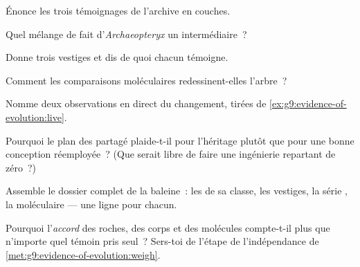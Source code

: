 \begin{exercise}[$\star$]\label{exo:g9:evidence-of-evolution:2}
Énonce les trois témoignages de l'archive en couches.
\end{exercise}

\begin{exercise}[$\star$]\label{exo:g9:evidence-of-evolution:3}
Quel mélange de  fait d'\emph{Archaeopteryx} un
intermédiaire~?
\end{exercise}

\begin{exercise}[$\star$]\label{exo:g9:evidence-of-evolution:4}
Donne trois vestiges et dis de quoi chacun témoigne.
\end{exercise}

\begin{exercise}[$\star$]\label{exo:g9:evidence-of-evolution:5}
Comment les comparaisons moléculaires redessinent-elles
l'arbre~?
\end{exercise}

\begin{exercise}[$\star$]\label{exo:g9:evidence-of-evolution:6}
Nomme deux observations en direct du changement, tirées de
\cref{ex:g9:evidence-of-evolution:live}.
\end{exercise}

\begin{exercise}[$\star\star$]\label{exo:g9:evidence-of-evolution:7}
Pourquoi le plan des  partagé plaide-t-il pour
l'héritage plutôt que pour une bonne conception
réemployée~? (Que serait libre de faire une ingénierie
repartant de zéro~?)
\end{exercise}

\begin{exercise}[$\star\star$]\label{exo:g9:evidence-of-evolution:8}
Assemble le dossier complet de la baleine~: les 
de sa classe, les vestiges, la série , la 
moléculaire --- une ligne pour chacun.
\end{exercise}

\begin{exercise}[$\star\star$]\label{exo:g9:evidence-of-evolution:9}
Pourquoi l'\emph{accord} des roches, des corps et des
molécules compte-t-il plus que n'importe quel témoin pris
seul~? Sers-toi de l'étape de l'indépendance de
\cref{met:g9:evidence-of-evolution:weigh}.
\end{exercise}

